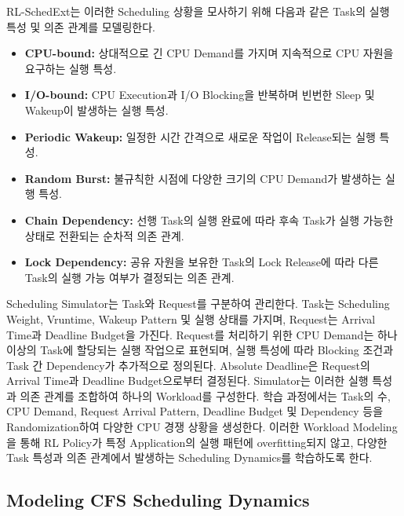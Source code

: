 RL-SchedExt는 이러한 Scheduling 상황을 모사하기 위해
다음과 같은 Task의 실행 특성 및 의존 관계를 모델링한다.

\begin{itemize}
    \item \textbf{CPU-bound:}
    상대적으로 긴 CPU Demand를 가지며 지속적으로
    CPU 자원을 요구하는 실행 특성.

    \item \textbf{I/O-bound:}
    CPU Execution과 I/O Blocking을 반복하며
    빈번한 Sleep 및 Wakeup이 발생하는 실행 특성.

    \item \textbf{Periodic Wakeup:}
    일정한 시간 간격으로 새로운 작업이 Release되는
    실행 특성.

    \item \textbf{Random Burst:}
    불규칙한 시점에 다양한 크기의 CPU Demand가
    발생하는 실행 특성.

    \item \textbf{Chain Dependency:}
    선행 Task의 실행 완료에 따라 후속 Task가 실행 가능한
    상태로 전환되는 순차적 의존 관계.

    \item \textbf{Lock Dependency:}
    공유 자원을 보유한 Task의 Lock Release에 따라
    다른 Task의 실행 가능 여부가 결정되는 의존 관계.
\end{itemize}

Scheduling Simulator는 Task와 Request를 구분하여 관리한다.
Task는 Scheduling Weight, Vruntime, Wakeup Pattern 및 실행 상태를 가지며,
Request는 Arrival Time과 Deadline Budget을 가진다.
Request를 처리하기 위한 CPU Demand는 하나 이상의 Task에 할당되는
실행 작업으로 표현되며, 실행 특성에 따라 Blocking 조건과
Task 간 Dependency가 추가적으로 정의된다.
Absolute Deadline은 Request의 Arrival Time과 Deadline Budget으로부터 결정된다.
Simulator는 이러한 실행 특성과 의존 관계를 조합하여 하나의 Workload를 구성한다.
학습 과정에서는 Task의 수, CPU Demand, Request Arrival Pattern,
Deadline Budget 및 Dependency 등을 Randomization하여
다양한 CPU 경쟁 상황을 생성한다.
이러한 Workload Modeling을 통해 RL Policy가 특정
Application의 실행 패턴에 overfitting되지 않고,
다양한 Task 특성과 의존 관계에서 발생하는 Scheduling
Dynamics를 학습하도록 한다.

\subsection{Modeling CFS Scheduling Dynamics}
\label{sec:design-modeling-cfs-scheduling-dynamics}

